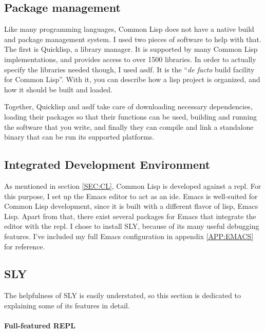 
\label{SEC:DEV_ENV}

\subsection{Package management}

Like many programming languages,
Common Lisp does not have a native build and package management system.
I used two pieces of software to help with that.
The first is Quicklisp,
a library manager.
It is supported by many Common Lisp implementations,
and provides access to over 1500 libraries.\cite{quicklisp}
In order to actually specify the libraries needed though,
I used \ac{asdf}.
It is the ``\textit{de facto} build facility for Common Lisp''\cite{asdf}.
With it,
you can describe how a lisp project is organized,
and how it should be built and loaded.

Together,
Quicklisp and \ac{asdf} take care of downloading necessary dependencies,
loading their packages so that their functions can be used,
building and running the software that you write,
and finally they can compile and link a standalone binary that can be run its supported platforms.

\subsection{Integrated Development Environment}

As mentioned in section \ref{SEC:CL},
Common Lisp is developed against a \ac{repl}.
For this purpose,
I set up the Emacs editor to act as an \ac{ide}.
Emacs is well-suited for Common Lisp development,
since it is built with a different flavor of lisp,
Emacs Lisp.
Apart from that,
there exist several packages for Emacs that integrate the editor with the \ac{repl}.
I chose to install SLY,
because of its many useful debugging features.
I've included my full Emacs configuration in appendix \ref{APP:EMACS} for reference.

\subsection{SLY}

The helpfulness of SLY is easily understated,
so this section is dedicated to explaining some of its features in detail\cite{sly}.

\paragraph{Full-featured REPL}

